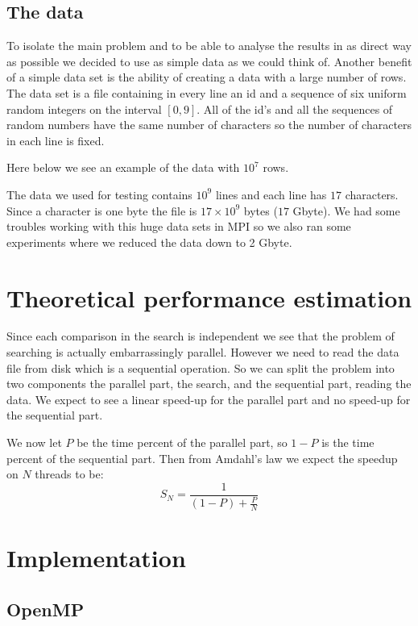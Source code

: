 \documentclass[a4paper,10pt]{article}
\begin{document}
\subsection{The data}
To isolate the main problem and to be able to analyse the results in as direct way as possible we decided to use as simple data as we could think of.
Another benefit of a simple data set is the ability of creating a data with a large number of rows. 
The data set is a file containing in every line an id and a sequence of six uniform random integers on the interval $[0,9]$.  
All of the id's and all the sequences of random numbers have the same number of characters so the number of characters in each line is fixed.

Here below we see an example of the data with $10^7$ rows.
  
The data we used for testing contains $10^{9}$ lines and each line has $17$ characters.  
Since a character is one byte
the file is $17 \times 10^9$ bytes ($17$ Gbyte).  We had some troubles working with this huge data
sets in MPI so we also ran some experiments where we reduced the data down to 2 Gbyte.

\section{Theoretical performance estimation}

Since each comparison in the search is independent we see that the problem of searching is actually 
embarrassingly parallel.  
However we need to read the data file from disk which is a sequential operation.  
So we can split the problem into two components the parallel part, the search,
and the sequential part, reading the data.
We expect to see a linear speed-up for the parallel part and
no speed-up for the sequential part.

We now let $P$ be the time percent of the parallel  
part, so $1-P$ is the time percent of the sequential part.  
Then from Amdahl's law we expect the speedup on $N$ threads to be:
$$ S_N = \frac{1}{(1-P)+\frac{P}{N}}$$

\section{Implementation}
  
\subsection{OpenMP}
\end{document}
